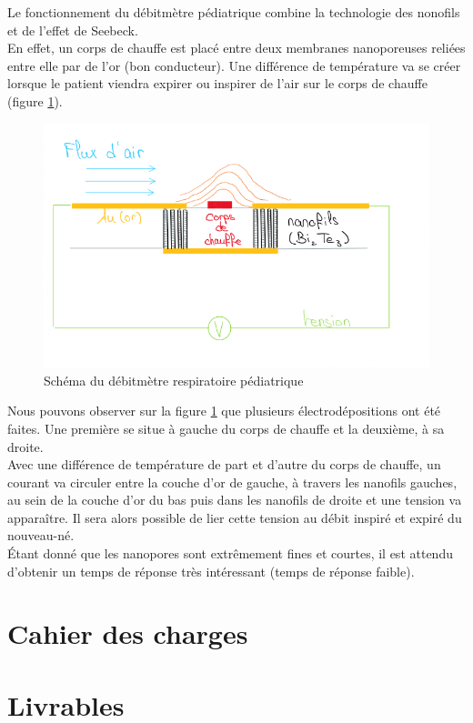 Le fonctionnement du débitmètre pédiatrique combine la technologie des nonofils et de l'effet de Seebeck. \\
En effet, un corps de chauffe est placé entre deux membranes nanoporeuses reliées entre elle par de l'or (bon conducteur). Une différence de 
température va se créer lorsque le patient viendra expirer ou inspirer de l'air sur le corps de chauffe (figure \ref{fig:CapteurFUN}). 
\begin{figure}[H]
    \centering
    \includegraphics[scale = 0.7]{images/CapteurFUN.png}
    \caption{Schéma du débitmètre respiratoire pédiatrique}
    \label{fig:CapteurFUN}
\end{figure}
Nous pouvons observer sur la figure \ref{fig:CapteurFUN} que plusieurs électrodépositions ont été faites. Une première se situe à gauche 
du corps de chauffe et la deuxième, à sa droite. \\
Avec une différence de température de part et d'autre du corps de chauffe, un courant va circuler entre la couche d'or de gauche, à 
travers les nanofils gauches, au sein de la couche d'or du bas puis dans les nanofils de droite et une tension va apparaître. Il sera 
alors possible de lier cette tension au débit inspiré et expiré du nouveau-né.\\

Étant donné que les nanopores sont extrêmement fines et courtes, il est attendu d'obtenir un temps de réponse très intéressant (temps 
de réponse faible). 

\section{Cahier des charges}

\section{Livrables}

